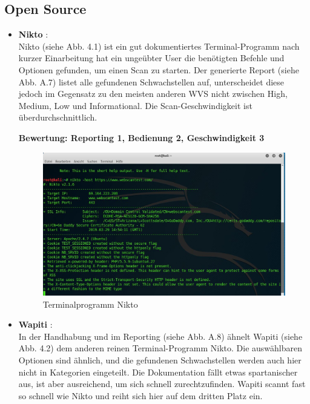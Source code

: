 \documentclass[12pt,oneside,a4paper,parskip,pointlessnumbers]{scrbook}
\begin{document}
    \subsection{Open Source}
      \begin{itemize}
      \item \textbf{Nikto} \cite{Nikto}:\\
      Nikto (siehe Abb. 4.1) ist ein gut dokumentiertes Terminal-Programm  nach kurzer Einarbeitung hat ein ungeübter User die benötigten Befehle und Optionen gefunden, um einen Scan zu starten.
      Der generierte Report (siehe Abb. A.7) listet alle gefundenen Schwachstellen auf, unterscheidet diese jedoch im Gegensatz zu den meisten anderen WVS nicht zwischen High, Medium, Low und Informational. Die Scan-Geschwindigkeit ist überdurchschnittlich.

      \textbf{Bewertung: Reporting 1, Bedienung 2, Geschwindigkeit 3}
        \vspace{20pt}
      \begin{figure}[H]
        \centering
        \includegraphics[width=1\textwidth]{Images/Nikto}
        \caption[Terminalprogramm Nikto]{Terminalprogramm Nikto}
      \end{figure}
      \vspace{20pt}

      \item \textbf{Wapiti} \cite{Wapiti}:\\
        In der Handhabung und im Reporting (siehe Abb. A.8) ähnelt Wapiti (siehe Abb. 4.2) dem anderen reinen Terminal-Programm Nikto. Die auswählbaren Optionen sind ähnlich, und die gefundenen Schwachstellen werden auch hier nicht in Kategorien eingeteilt. Die Dokumentation fällt etwas spartanischer aus, ist aber ausreichend, um sich schnell zurechtzufinden. Wapiti scannt fast so schnell wie Nikto und reiht sich hier auf dem dritten Platz ein.


\end{itemize}
\end{document}
